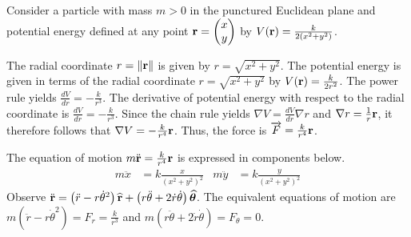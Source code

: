 \begin{answer}
	Consider a particle with mass $m > 0$ in the punctured Euclidean plane and potential energy defined at any point $\mathbf{r} = \begin{pmatrix} x \\ y \end{pmatrix}$ by $V(\mathbf{r}) = \frac{k}{2(x^2+y^2)}$.

	The radial coordinate $r = \left\|\mathbf{r}\right\|$ is given by $r = \sqrt{x^2 + y^2}$.
	The potential energy is given in terms of the radial coordinate $r = \sqrt{x^2 + y^2}$ by $V\!\left(\mathbf{r}\right) = \frac{k}{2 r^2}$.
	The power rule yields $\frac{dV}{dr} = - \frac{k}{r^3}$.
	The derivative of potential energy with respect to the radial coordinate is $\frac{d V}{d r} = - \frac{k}{r^3}$.
	Since the chain rule yields $\nabla V = \frac{dV}{dr} \nabla r$ and $\nabla r = \frac{1}{r} \mathbf{r}$, it therefore follows that $\nabla V = - \frac{k}{r^4} \mathbf{r}$.
	Thus, the force is $\overrightarrow{F} = \frac{k}{r^4} \mathbf{r}$.

	The equation of motion $m \ddot{\mathbf{r}} = \frac{k}{r^4} \mathbf{r}$ is expressed in components below.
	\begin{align*}
		m \ddot{x} & = k\frac{x}{(x^2+y^2)^2}
		           &
		m \ddot{y} & = k \frac{y}{(x^2+y^2)^2}
	\end{align*}
	Observe $\ddot{\mathbf{r}} = \left(\ddot{r} - r \dot{\theta}^2\right) \widehat{\mathbf{r}} + \left(r \ddot{\theta} + 2 \dot{r} \dot{\theta}\right) \widehat{\bm{\theta}}$.
	The equivalent equations of motion are $m\left(\ddot{r} - r\dot{\theta}^2\right) = F_r = \frac{k}{r^3}$ and $m\left(r\ddot{\theta} + 2\dot{r}\dot{\theta}\right) = F_\theta = 0$.


\end{answer}
